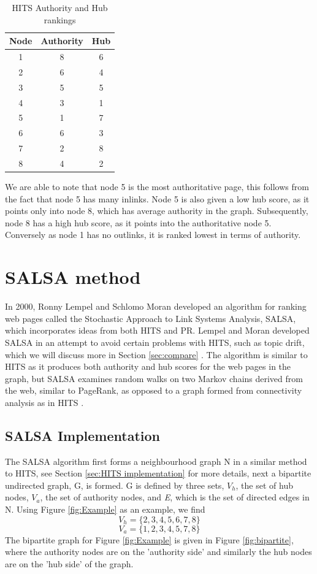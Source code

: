 \documentclass[11pt]{report}
\begin{document}
\begin{table}[h] \caption{HITS Authority and Hub rankings}
 \centering
 \begin{tabular} {c| c c} 
 Node & Authority & Hub \\ [0.5ex] 
 \hline
 1&8&6\\
 2&6&4\\
 3&5&5\\
 4&3&1\\
 5&1&7\\
 6&6&3\\
 7&2&8\\
 8&4&2\\
 \end{tabular}
 \label{tble:HITS}
\end{table} 

We are able to note that node 5 is the most authoritative page, this follows from the fact that node 5 has many inlinks. Node 5 is also given a low hub score, as it points only into node 8, which has average authority in the graph. Subsequently, node 8 has a high hub score, as it points into the authoritative node 5. Conversely as node 1 has no outlinks, it is ranked lowest in terms of authority.

\section{SALSA method} \label{sec:SALSA}
In 2000, Ronny Lempel and Schlomo Moran developed an algorithm for ranking web pages called the Stochastic Approach to Link Systems Analysis, SALSA, which incorporates ideas from both HITS and PR. Lempel and Moran developed SALSA in an attempt to avoid certain problems with HITS, such as topic drift, which we will discuss more in Section \ref{sec:compare} \cite{bonato}. The algorithm is similar to HITS as it produces both authority and hub scores for the web pages in the graph, but SALSA examines random walks on two Markov chains derived from the web, similar to PageRank, as opposed to a graph formed from connectivity analysis as in HITS \cite{lempel2000stochastic}. 

\subsection{SALSA Implementation}\label{sec:SALSA implementation}
The SALSA algorithm first forms a neighbourhood graph N in a similar method to HITS, see Section \ref{sec:HITS implementation} for more details, next a bipartite undirected graph, G, is formed. G is defined by three sets, $V_h$, the set of hub nodes, $V_a$, the set of authority nodes, and \textit{E}, which is the set of directed edges in N. Using Figure \ref{fig:Example} as an example, we find 
\[V_h = \{2,3,4,5,6,7,8\} \]
\[V_a = \{1,2,3,4,5,7,8\} \]
The bipartite graph for Figure \ref{fig:Example} is given in Figure \ref{fig:bipartite}, where the authority nodes are on the 'authority side' and similarly the hub nodes are on the 'hub side' of the graph. 
\end{document}
